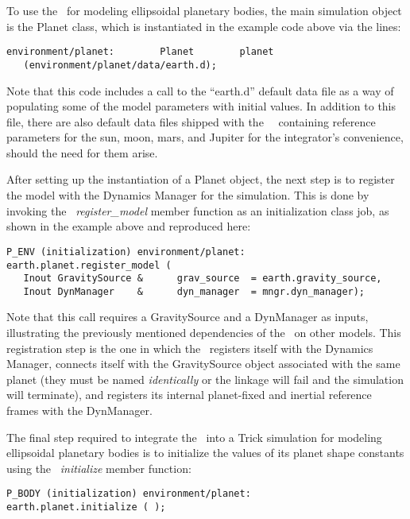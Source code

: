To use the \planetDesc\ for modeling ellipsoidal planetary bodies, the main
simulation object is the Planet class, which is instantiated
in the example code above via the lines:

\begin{verbatim}
environment/planet:        Planet        planet
   (environment/planet/data/earth.d);
\end{verbatim}

Note that this code includes a call to the ``earth.d'' default data file as a
way of populating some of the model parameters with initial values. In addition
to this file, there are also default data files shipped with the \JEODid\
\planetDesc\ containing reference parameters for the sun, moon, mars, and
Jupiter for the integrator's convenience, should the need for them arise.

After setting up the instantiation of a Planet object, the next step is to
register the model with the Dynamics Manager for the simulation. This is
done by invoking the \planetDesc\ {\em register\_model} member function as an
initialization class job, as shown in the example above and reproduced here:

\begin{verbatim}
P_ENV (initialization) environment/planet:
earth.planet.register_model (
   Inout GravitySource &      grav_source  = earth.gravity_source,
   Inout DynManager    &      dyn_manager  = mngr.dyn_manager);
\end{verbatim}

Note that this call requires a GravitySource and a DynManager as inputs,
illustrating the previously mentioned dependencies of the \planetDesc\ on other
models. This registration step is the one in which the \planetDesc\ registers
itself with the Dynamics Manager, connects itself with the GravitySource object
associated with the same planet (they must be named {\em identically} or the
linkage will fail and the simulation will terminate), and registers its
internal planet-fixed and inertial reference frames with the DynManager.

The final step required to integrate the \planetDesc\ into a Trick simulation
for modeling ellipsoidal planetary bodies is to initialize the
values of its planet shape constants using the
\planetDesc\ {\em initialize} member function:

\begin{verbatim}
P_BODY (initialization) environment/planet:
earth.planet.initialize ( );
\end{verbatim}

